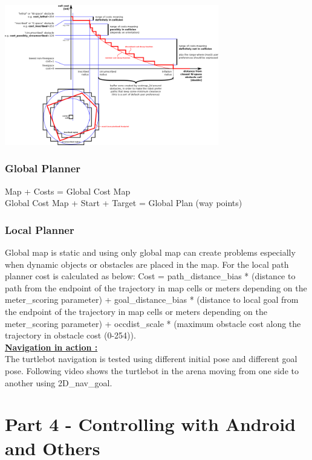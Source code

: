 \documentclass[10pt,a4paper]{article}
\begin{document}
\begin{center}
\includegraphics[width=0.7\textwidth]{images/inflation.png}\\
\end{center}

\subsubsection{Global Planner}

Map + Costs = Global Cost Map \\
Global Cost Map + Start + Target = Global Plan (way points)

\subsubsection{Local Planner}

Global map is static and using only global map can create problems especially when dynamic objects or obstacles are placed in the map. 
For the local path planner cost is calculated as below:
Cost = path\_distance\_bias * (distance to path from the endpoint of the trajectory in map cells or meters depending on the meter\_scoring parameter) + goal\_distance\_bias * (distance to local goal from the endpoint of the trajectory in map cells or meters depending on the meter\_scoring parameter) + occdist\_scale * (maximum obstacle cost along the trajectory in obstacle cost (0-254)).\\

\underline{\textbf{Navigation in action :}}\\
The turtlebot navigation is tested using different initial pose and different goal pose. Following video shows the turtlebot in the arena moving from one side to another using 2D\_nav\_goal.

\section{Part 4 - Controlling with Android and Others}
\end{document}
